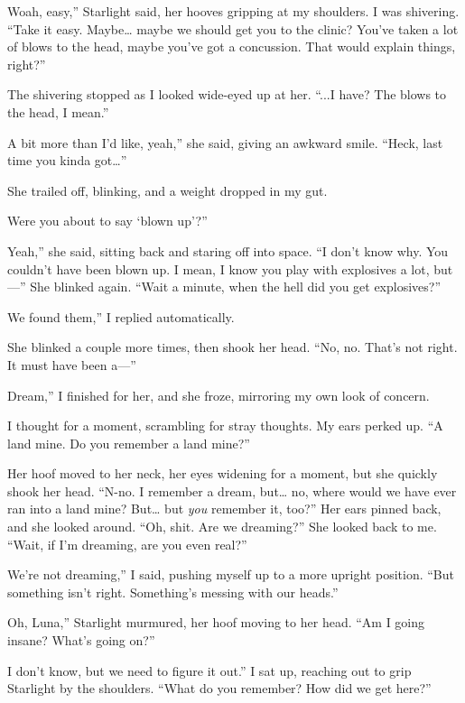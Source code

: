 \leavevmode{}Woah, easy,” Starlight said, her hooves gripping at my shoulders. I was shivering. “Take it easy. Maybe… maybe we should get you to the clinic? You’ve taken a lot of blows to the head, maybe you’ve got a concussion. That would explain things, right?”

The shivering stopped as I looked wide-eyed up at her. “...I have? The blows to the head, I mean.”

\leavevmode{}A bit more than I’d like, yeah,” she said, giving an awkward smile. “Heck, last time you kinda got…”

She trailed off, blinking, and a weight dropped in my gut.

\leavevmode{}Were you about to say ‘blown up’?”

\leavevmode{}Yeah,” she said, sitting back and staring off into space. “I don’t know why. You couldn’t have been blown up. I mean, I know you play with explosives a lot, but—” She blinked again. “Wait a minute, when the hell did you get explosives?”

\leavevmode{}We found them,” I replied automatically.

She blinked a couple more times, then shook her head. “No, no. That’s not right. It must have been a—”

\leavevmode{}Dream,” I finished for her, and she froze, mirroring my own look of concern.

I thought for a moment, scrambling for stray thoughts. My ears perked up. “A land mine. Do you remember a land mine?”

Her hoof moved to her neck, her eyes widening for a moment, but she quickly shook her head. “N-no. I remember a dream, but… no, where would we have ever ran into a land mine? But… but \textit{you} remember it, too?” Her ears pinned back, and she looked around. “Oh, shit. Are we dreaming?” She looked back to me. “Wait, if I’m dreaming, are you even real?”

\leavevmode{}We’re not dreaming,” I said, pushing myself up to a more upright position. “But something isn’t right. Something’s messing with our heads.”

\leavevmode{}Oh, Luna,” Starlight murmured, her hoof moving to her head. “Am I going insane? What’s going on?”

\leavevmode{}I don’t know, but we need to figure it out.” I sat up, reaching out to grip Starlight by the shoulders. “What do you remember? How did we get here?”

